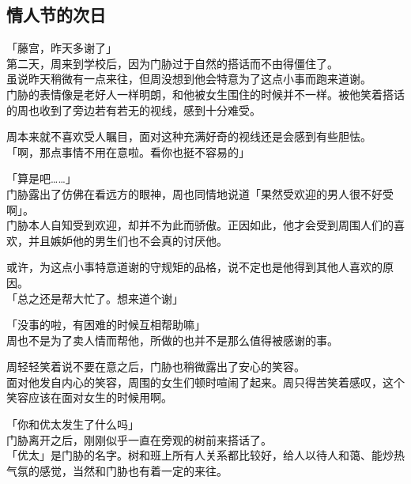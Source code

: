 \subsection{情人节的次日}

「藤宫，昨天多谢了」\\

第二天，周来到学校后，因为门胁过于自然的搭话而不由得僵住了。\\

虽说昨天稍微有一点来往，但周没想到他会特意为了这点小事而跑来道谢。\\

门胁的表情像是老好人一样明朗，和他被女生围住的时候并不一样。被他笑着搭话的周也收到了旁边若有若无的视线，感到十分难受。

周本来就不喜欢受人瞩目，面对这种充满好奇的视线还是会感到有些胆怯。\\

「啊，那点事情不用在意啦。看你也挺不容易的」

「算是吧……」\\

门胁露出了仿佛在看远方的眼神，周也同情地说道「果然受欢迎的男人很不好受啊」。\\

门胁本人自知受到欢迎，却并不为此而骄傲。正因如此，他才会受到周围人们的喜欢，并且嫉妒他的男生们也不会真的讨厌他。

或许，为这点小事特意道谢的守规矩的品格，说不定也是他得到其他人喜欢的原因。\\

「总之还是帮大忙了。想来道个谢」

「没事的啦，有困难的时候互相帮助嘛」\\

周也不是为了卖人情而帮他，所做的也并不是那么值得被感谢的事。

周轻轻笑着说不要在意之后，门胁也稍微露出了安心的笑容。\\

面对他发自内心的笑容，周围的女生们顿时喧闹了起来。周只得苦笑着感叹，这个笑容应该在面对女生的时候用啊。\\

\vspace{2\baselineskip}

「你和优太发生了什么吗」\\

门胁离开之后，刚刚似乎一直在旁观的树前来搭话了。\\

「优太」是门胁的名字。树和班上所有人关系都比较好，给人以待人和蔼、能炒热气氛的感觉，当然和门胁也有着一定的来往。


